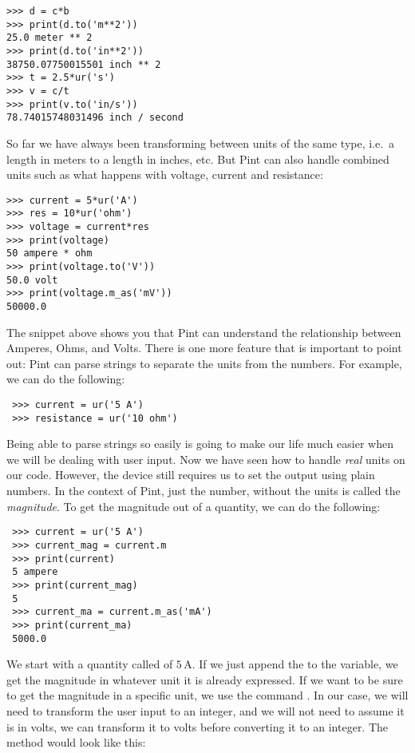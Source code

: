 \begin{verbatim}
>>> d = c*b
>>> print(d.to('m**2'))
25.0 meter ** 2
>>> print(d.to('in**2'))
38750.07750015501 inch ** 2
>>> t = 2.5*ur('s')
>>> v = c/t
>>> print(v.to('in/s'))
78.74015748031496 inch / second
\end{verbatim}

So far we have always been transforming between units of the same type, i.e.\ a length in meters to a length in inches, etc. But Pint can also handle combined units such as what happens with voltage, current and resistance:

\begin{verbatim}
>>> current = 5*ur('A')
>>> res = 10*ur('ohm')
>>> voltage = current*res
>>> print(voltage)
50 ampere * ohm
>>> print(voltage.to('V'))
50.0 volt
>>> print(voltage.m_as('mV'))
50000.0
\end{verbatim}

The snippet above shows you that Pint can understand the relationship between Amperes, Ohms, and Volts. There is one more feature that is important to point out: Pint can parse strings to separate the units from the numbers. For example, we can do the following:

\begin{verbatim}
 >>> current = ur('5 A')
 >>> resistance = ur('10 ohm')
\end{verbatim}

Being able to parse strings so easily is going to make our life much easier when we will be dealing with user input. Now we have seen how to handle \emph{real} units on our code. However, the device still requires us to set the output using plain numbers. In the context of Pint, just the number, without the units is called the \emph{magnitude}. To get the magnitude out of a quantity, we can do the following:

\begin{verbatim}
 >>> current = ur('5 A')
 >>> current_mag = current.m
 >>> print(current)
 5 ampere
 >>> print(current_mag)
 5
 >>> current_ma = current.m_as('mA')
 >>> print(current_ma)
 5000.0
\end{verbatim}

We start with a quantity called  of $5\,\textrm{A}$. If we just append the  to the variable, we get the magnitude in whatever unit it is already expressed. If we want to be sure to get the magnitude in a specific unit, we use the command . In our case, we will need to transform the user input to an integer, and we will not need to assume it is in volts, we can transform it to volts before converting it to an integer. The  method would look like this:

